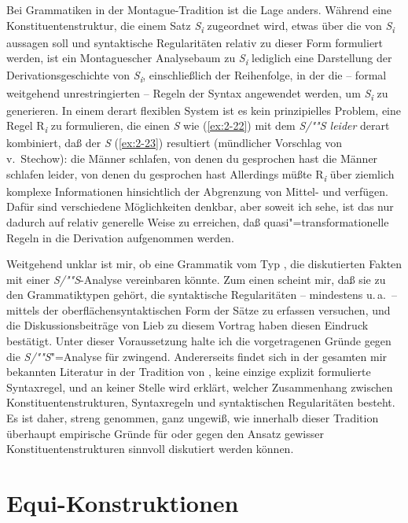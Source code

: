\documentclass[output=paper]{langsci/langscibook}
\begin{document}
Bei Grammatiken in der Montague-Tradition ist die Lage anders. Während eine Konstituentenstruktur, die einem Satz \textit{S\textsubscript{i}} zugeordnet wird, etwas über die  von \textit{S\textsubscript{i}} aussagen soll und syntaktische Regularitäten relativ zu dieser Form formuliert werden, ist ein Montaguescher Analysebaum zu \textit{S\textsubscript{i}} lediglich eine Darstellung der Derivationsgeschichte von \textit{S\textsubscript{i}}, einschließlich der Reihenfolge, in der die -- formal weitgehend unrestringierten -- Regeln der Syntax angewendet werden, um \textit{S\textsubscript{i}} zu generieren. In einem derart flexiblen System ist es kein prinzipielles Problem, eine Regel R\textsubscript{\textit{i}} zu formulieren, die einen \textit{S} wie (\ref{ex:2-22}) mit dem \textit{S/""S leider} derart kombiniert, daß der \textit{S} (\ref{ex:2-23}) resultiert (mündlicher Vorschlag von v.\ Stechow):
\ea die Männer schlafen, von denen du gesprochen hast \label{ex:2-22}
\z 
\ea die Männer schlafen leider, von denen du gesprochen hast \label{ex:2-23}
\z
Allerdings müßte R\textsubscript{\textit{i}} über ziemlich komplexe Informationen hinsichtlich der Abgrenzung von Mittel- und  verfügen. Dafür sind verschiedene Möglichkeiten denkbar, aber soweit ich sehe, ist das nur dadurch auf relativ generelle Weise zu erreichen, daß quasi"=transformationelle Regeln in die Derivation aufgenommen werden.

Weitgehend unklar ist mir, ob eine Grammatik vom Typ \citet{Eisenberg76}, \citet{Eisenberg75} die diskutierten Fakten mit einer \textit{S/""S}-Analyse vereinbaren könnte. Zum einen scheint mir, daß sie zu den Grammatiktypen gehört, die syntaktische Regularitäten -- mindestens u.\,a.\  -- mittels der oberflächensyntaktischen Form der Sätze zu erfassen versuchen, und die Diskussionsbeiträge von Lieb zu diesem Vortrag haben diesen Eindruck bestätigt. Unter dieser Voraussetzung halte ich die vorgetragenen Gründe gegen die \textit{S/""S}"=Analyse für zwingend. Andererseits findet sich in der gesamten mir bekannten Literatur in der Tradition von \citet{Eisenberg76}, \citet{Eisenberg75} keine einzige explizit formulierte Syntaxregel, und an keiner Stelle wird erklärt, welcher Zusammenhang zwischen Konstituentenstrukturen, Syntaxregeln und syntaktischen Regularitäten besteht. Es ist daher, streng genommen, ganz ungewiß, wie innerhalb dieser Tradition überhaupt empirische Gründe für oder gegen den Ansatz gewisser Konstituentenstrukturen sinnvoll diskutiert werden können.

\section{Equi-Konstruktionen}%
\label{sec:2-2}
\end{document}
